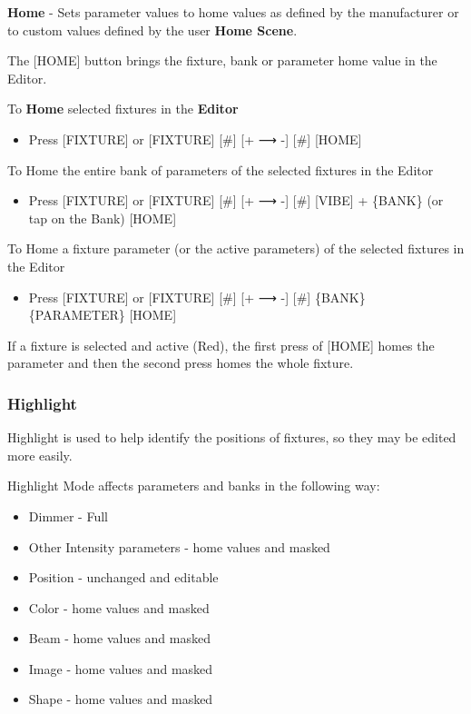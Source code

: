 \documentclass[
]{article}
\providecommand{\tightlist}{%
  \setlength{\itemsep}{0pt}\setlength{\parskip}{0pt}}
\begin{document}
\textbf{Home} - Sets parameter values to home values as defined by the manufacturer or to custom values defined by the user \textbf{Home Scene}.

The {[}HOME{]} button brings the fixture, bank or parameter home value in the Editor.

To \textbf{Home} selected fixtures in the \textbf{Editor}

\begin{itemize}
\tightlist
\item
  Press {[}FIXTURE{]} or {[}FIXTURE{]} {[}\#{]} {[}+ ⟶ -{]} {[}\#{]} {[}HOME{]}
\end{itemize}

To Home the entire bank of parameters of the selected fixtures in the Editor

\begin{itemize}
\tightlist
\item
  Press {[}FIXTURE{]} or {[}FIXTURE{]} {[}\#{]} {[}+ ⟶ -{]} {[}\#{]} {[}VIBE{]} + \{BANK\} (or tap on the Bank) {[}HOME{]}
\end{itemize}

To Home a fixture parameter (or the active parameters) of the selected fixtures in the Editor

\begin{itemize}
\tightlist
\item
  Press {[}FIXTURE{]} or {[}FIXTURE{]} {[}\#{]} {[}+ ⟶ -{]} {[}\#{]} \{BANK\} \{PARAMETER\} {[}HOME{]}
\end{itemize}

If a fixture is selected and active (Red), the first press of {[}HOME{]} homes the parameter and then the second press homes the whole fixture.

\hypertarget{highlight}{%
\subsubsection{Highlight}\label{highlight}}

Highlight is used to help identify the positions of fixtures, so they may be edited more easily.

Highlight Mode affects parameters and banks in the following way:

\begin{itemize}
\item
  Dimmer - Full
\item
  Other Intensity parameters - home values and masked
\item
  Position - unchanged and editable
\item
  Color - home values and masked
\item
  Beam - home values and masked
\item
  Image - home values and masked
\item
  Shape - home values and masked
\end{itemize}
\end{document}
